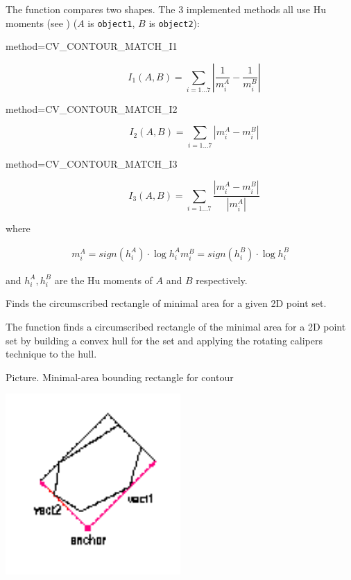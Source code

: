 The function compares two shapes. The 3 implemented methods all use Hu moments (see ) ($A$ is \texttt{object1}, $B$ is \texttt{object2}):

\begin{description}
\item[method=CV\_CONTOUR\_MATCH\_I1]
\[ I_1(A,B) = \sum_{i=1...7} \left| \frac{1}{m^A_i} - \frac{1}{m^B_i} \right| \]

\item[method=CV\_CONTOUR\_MATCH\_I2]
\[ I_2(A,B) = \sum_{i=1...7} \left| m^A_i - m^B_i \right| \]

\item[method=CV\_CONTOUR\_MATCH\_I3]
\[ I_3(A,B) = \sum_{i=1...7} \frac{ \left| m^A_i - m^B_i \right| }{ \left| m^A_i \right| } \]
\end{description}

where

\[
\begin{array}{l}
m^A_i = sign(h^A_i) \cdot \log{h^A_i}
m^B_i = sign(h^B_i) \cdot \log{h^B_i}
\end{array}
\]

and $h^A_i, h^B_i$ are the Hu moments of $A$ and $B$ respectively.


Finds the circumscribed rectangle of minimal area for a given 2D point set.


\begin{description}
\end{description}

The function finds a circumscribed rectangle of the minimal area for a 2D point set by building a convex hull for the set and applying the rotating calipers technique to the hull.

Picture. Minimal-area bounding rectangle for contour

\includegraphics[width=0.5\textwidth]{pics/minareabox.png}

